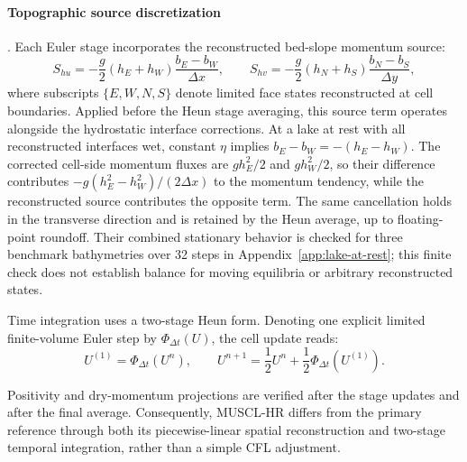\paragraph{Topographic source discretization}. Each Euler stage incorporates the reconstructed bed-slope momentum source:
\begin{equation}
S_{hu} = -\frac{g}{2}(h_E + h_W)\frac{b_E - b_W}{\Delta x},
\qquad
S_{hv} = -\frac{g}{2}(h_N + h_S)\frac{b_N - b_S}{\Delta y},
\end{equation}
where subscripts $\{E, W, N, S\}$ denote limited face states reconstructed at cell boundaries. Applied before the Heun stage averaging, this source term operates alongside the hydrostatic interface corrections. At a lake at rest with all reconstructed interfaces wet, constant $\eta$ implies $b_E - b_W = -(h_E - h_W)$. The corrected cell-side momentum fluxes are $gh_E ^ 2/2$ and $gh_W ^ 2/2$, so their difference contributes $-g(h_E ^ 2 - h_W ^ 2) / (2\Delta x)$ to the momentum tendency, while the reconstructed source contributes the opposite term. The same cancellation holds in the transverse direction and is retained by the Heun average, up to floating-point roundoff. Their combined stationary behavior is checked for three benchmark bathymetries over 32 steps in Appendix~\ref{app:lake-at-rest}; this finite check does not establish balance for moving equilibria or arbitrary reconstructed states.

Time integration uses a two-stage Heun form. Denoting one explicit limited finite-volume Euler step by $\Phi_{\Delta t}(U)$, the cell update reads:
\begin{equation}
U ^ {(1)} = \Phi_{\Delta t}(U ^ n),\qquad
U ^ {n + 1} = \frac{1}{2} U ^ n +
\frac{1}{2}\Phi_{\Delta t}\!\left(U ^ {(1)}\right).
\end{equation}

Positivity and dry-momentum projections are verified after the stage updates and after the final average. Consequently, MUSCL-HR differs from the primary reference through both its piecewise-linear spatial reconstruction and two-stage temporal integration, rather than a simple CFL adjustment.

